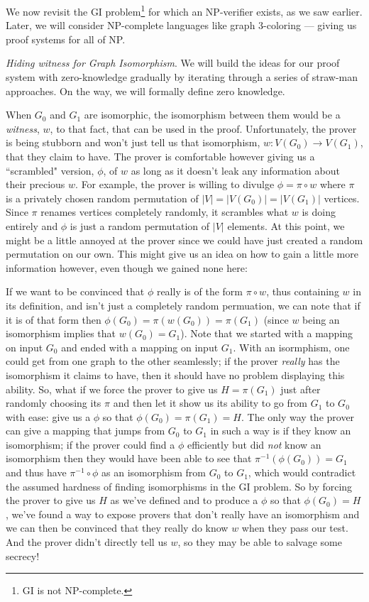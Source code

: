 	We now revisit the GI problem\footnote{GI is not NP-complete.} for which an NP-verifier exists, as we saw earlier. Later, we will consider NP-complete languages like graph 3-coloring --- giving us proof systems for all of NP. \smallskip

	\noindent \textit{Hiding witness for Graph Isomorphism}. We will build the ideas for our proof system with zero-knowledge gradually by iterating through a series of straw-man approaches. On the way, we will formally define zero knowledge. 

	When $G_0$ and $G_1$ are isomorphic, the isomorphism between them would be a \textit{witness}, $w$, to that fact, that can be used in the proof.  Unfortunately, the prover is being stubborn and won't just tell us that isomorphism, $w:V(G_0)\rightarrow V(G_1)$, that they claim to have.  The prover is comfortable however giving us a ``scrambled" version, $\phi$, of $w$ as long as it doesn't leak any information about their precious $w$.  For example, the prover is willing to divulge $\phi = \pi \circ w$ where $\pi$ is a privately chosen random permutation of $|V|=|V(G_0)|=|V(G_1)|$ vertices.  Since $\pi$ renames vertices completely randomly, it scrambles what $w$ is doing entirely and $\phi$ is just a random permutation of $|V|$ elements.  At this point, we might be a little annoyed at the prover since we could have just created a random permutation on our own.  This might give us an idea on how to gain a little more information however, even though we gained none here:
		
		If we want to be convinced that $\phi$ really is of the form $\pi \circ w$, thus containing $w$ in its definition, and isn't just a completely random permuation, we can note that if it is of that form then $\phi(G_0)=\pi(w(G_0))=\pi(G_1)$ (since $w$ being an isomorphism implies that $w(G_0)=G_1$).  Note that we started with a mapping on input $G_0$ and ended with a mapping on input $G_1$.  With an isormphism, one could get from one graph to the other seamlessly; if the prover \textit{really} has the isomorphism it claims to have, then it should have no problem displaying this ability.  So, what if we force the prover to give us $H=\pi (G_1)$ just after randomly choosing its $\pi$ and then let it show us its ability to go from $G_1$ to $G_0$ with ease: give us a $\phi$ so that $\phi(G_0)=\pi(G_1)=H$.  The only way the prover can give a mapping that jumps from $G_0$ to $G_1$ in such a way is if they know an isomorphism; if the prover could find a $\phi$ efficiently but did \textit{not} know an isomorphism then they would have been able to see that $\pi^{-1}(\phi(G_0))=G_1$ and thus have $\pi^{-1}\circ\phi$ as an isomorphism from $G_0$ to $G_1$, which would contradict the assumed hardness of finding isomorphisms in the GI problem.  So by forcing the prover to give us $H$ as we've defined and to produce a $\phi$ so that $\phi(G_0)=H$, we've found a way to expose provers that don't really have an isomorphism and we can then be convinced that they really do know $w$ when they pass our test.  And the prover didn't directly tell us $w$, so they may be able to salvage some secrecy!
		
